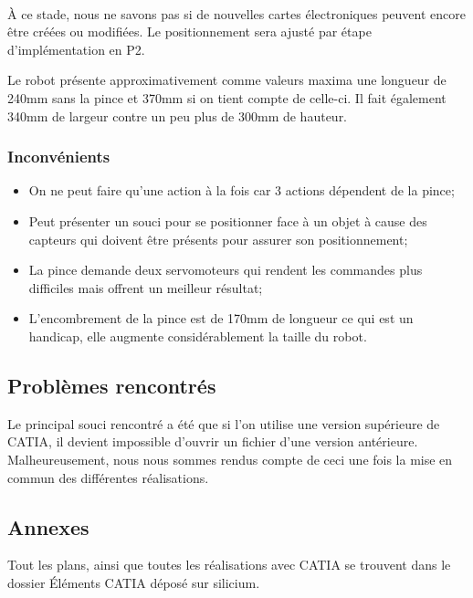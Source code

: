 \paragraph{}
À ce stade, nous ne savons pas si de nouvelles cartes électroniques peuvent encore être créées ou modifiées. Le positionnement sera ajusté par étape d'implémentation en P2.

\noindent Le robot présente approximativement comme valeurs maxima une longueur de 240mm sans la pince et 370mm si on tient compte de celle-ci. Il fait également 340mm de largeur contre un peu plus de 300mm de hauteur.

\subsubsection{Inconvénients}
\begin{itemize}
	\item On ne peut faire qu'une action à la fois car 3 actions dépendent de la pince;
	\item Peut présenter un souci pour se positionner face à un objet à cause des capteurs qui doivent être présents pour assurer son positionnement;
	\item  La pince demande deux servomoteurs qui rendent les commandes plus difficiles mais offrent un meilleur résultat;
	\item L'encombrement de la pince est de 170mm de longueur ce qui est un handicap, elle augmente considérablement la taille du robot.
\end{itemize}

\subsection{Problèmes rencontrés}
Le principal souci rencontré a été que si l'on utilise une version supérieure de CATIA, il devient impossible d'ouvrir un fichier d'une version antérieure. Malheureusement, nous nous sommes rendus compte de ceci une fois la mise en commun des différentes réalisations.

\subsection{Annexes}
Tout les plans, ainsi que toutes les réalisations avec CATIA se trouvent dans le dossier Éléments CATIA déposé sur silicium.